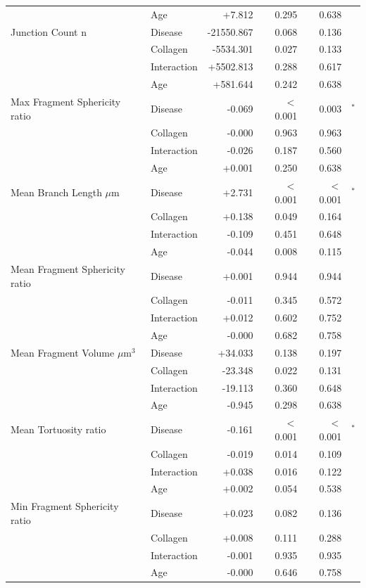 \documentclass[11pt,a4paper]{article}
\begin{document}
\begin{longtable}{llrrrr}
   & Age & +7.812 & 0.295 & 0.638 &  \\
  Junction Count n & Disease & -21550.867 & 0.068 & 0.136 &  \\
   & Collagen & -5534.301 & 0.027 & 0.133 &  \\
   & Interaction & +5502.813 & 0.288 & 0.617 &  \\
   & Age & +581.644 & 0.242 & 0.638 &  \\
  Max Fragment Sphericity ratio & Disease & -0.069 & $<$0.001 & 0.003 & $^{*}$ \\
   & Collagen & -0.000 & 0.963 & 0.963 &  \\
   & Interaction & -0.026 & 0.187 & 0.560 &  \\
   & Age & +0.001 & 0.250 & 0.638 &  \\
  Mean Branch Length $\mu$m & Disease & +2.731 & $<$0.001 & $<$0.001 & $^{*}$ \\
   & Collagen & +0.138 & 0.049 & 0.164 &  \\
   & Interaction & -0.109 & 0.451 & 0.648 &  \\
   & Age & -0.044 & 0.008 & 0.115 &  \\
  Mean Fragment Sphericity ratio & Disease & +0.001 & 0.944 & 0.944 &  \\
   & Collagen & -0.011 & 0.345 & 0.572 &  \\
   & Interaction & +0.012 & 0.602 & 0.752 &  \\
   & Age & -0.000 & 0.682 & 0.758 &  \\
  Mean Fragment Volume $\mu$m$^{3}$ & Disease & +34.033 & 0.138 & 0.197 &  \\
   & Collagen & -23.348 & 0.022 & 0.131 &  \\
   & Interaction & -19.113 & 0.360 & 0.648 &  \\
   & Age & -0.945 & 0.298 & 0.638 &  \\
  Mean Tortuosity ratio & Disease & -0.161 & $<$0.001 & $<$0.001 & $^{*}$ \\
   & Collagen & -0.019 & 0.014 & 0.109 &  \\
   & Interaction & +0.038 & 0.016 & 0.122 &  \\
   & Age & +0.002 & 0.054 & 0.538 &  \\
  Min Fragment Sphericity ratio & Disease & +0.023 & 0.082 & 0.136 &  \\
   & Collagen & +0.008 & 0.111 & 0.288 &  \\
   & Interaction & -0.001 & 0.935 & 0.935 &  \\
   & Age & -0.000 & 0.646 & 0.758 &  \\

\end{longtable}
\end{document}
